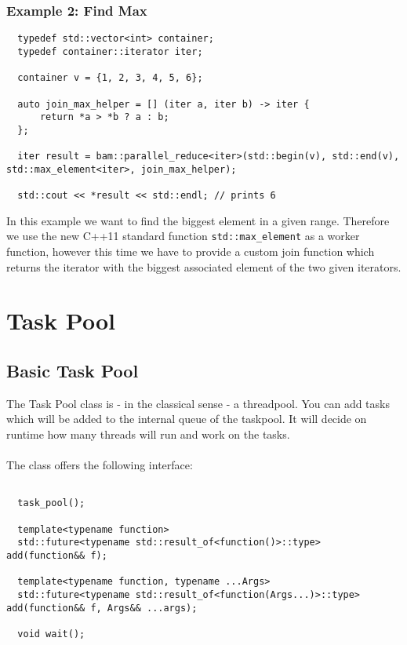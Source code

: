 \documentclass[11pt, a4paper]{article}
\begin{document}
\subsubsection{Example 2: Find Max}
\begin{lstlisting}
  typedef std::vector<int> container;
  typedef container::iterator iter;

  container v = {1, 2, 3, 4, 5, 6};

  auto join_max_helper = [] (iter a, iter b) -> iter {
      return *a > *b ? a : b;
  };

  iter result = bam::parallel_reduce<iter>(std::begin(v), std::end(v), std::max_element<iter>, join_max_helper);

  std::cout << *result << std::endl; // prints 6
\end{lstlisting}

In this example we want to find the biggest element in a given range. Therefore we use the new C++11 standard function \texttt{std::max\_element} as a worker function, however this time we have to provide a custom join function which returns the iterator with the biggest associated element of the two given iterators.

\section{Task Pool}
\subsection{ Basic Task Pool}

The Task Pool class is - in the classical sense - a threadpool. You can add tasks which will be added to the internal queue of the taskpool. It will decide on runtime how many threads will run and work on the tasks. \\\\
The class offers the following interface:\\

\begin{lstlisting}

  task_pool();

  template<typename function>
  std::future<typename std::result_of<function()>::type> add(function&& f);

  template<typename function, typename ...Args>
  std::future<typename std::result_of<function(Args...)>::type> add(function&& f, Args&& ...args);

  void wait();

\end{lstlisting}
\end{document}
